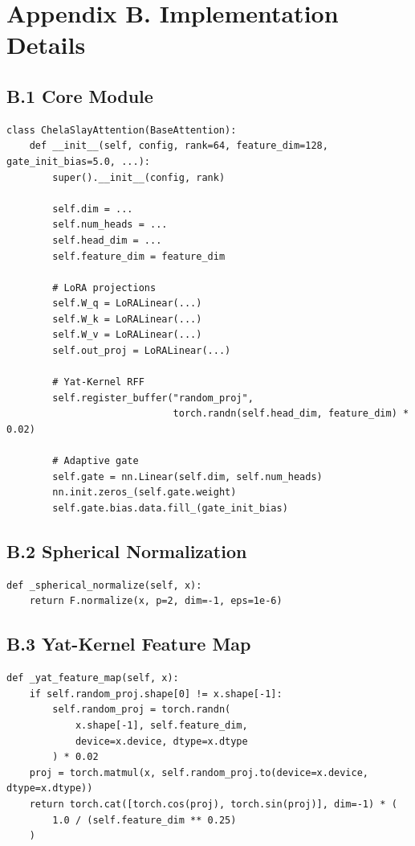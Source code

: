 \section{Appendix B. Implementation Details}

\subsection{B.1 Core Module}

\begin{lstlisting}
class ChelaSlayAttention(BaseAttention):
    def __init__(self, config, rank=64, feature_dim=128, gate_init_bias=5.0, ...):
        super().__init__(config, rank)
        
        self.dim = ...
        self.num_heads = ...
        self.head_dim = ...
        self.feature_dim = feature_dim
        
        # LoRA projections
        self.W_q = LoRALinear(...)
        self.W_k = LoRALinear(...)
        self.W_v = LoRALinear(...)
        self.out_proj = LoRALinear(...)
        
        # Yat-Kernel RFF
        self.register_buffer("random_proj", 
                             torch.randn(self.head_dim, feature_dim) * 0.02)
        
        # Adaptive gate
        self.gate = nn.Linear(self.dim, self.num_heads)
        nn.init.zeros_(self.gate.weight)
        self.gate.bias.data.fill_(gate_init_bias)
\end{lstlisting}

\subsection{B.2 Spherical Normalization}

\begin{lstlisting}
def _spherical_normalize(self, x):
    return F.normalize(x, p=2, dim=-1, eps=1e-6)
\end{lstlisting}

\subsection{B.3 Yat-Kernel Feature Map}

\begin{lstlisting}
def _yat_feature_map(self, x):
    if self.random_proj.shape[0] != x.shape[-1]:
        self.random_proj = torch.randn(
            x.shape[-1], self.feature_dim, 
            device=x.device, dtype=x.dtype
        ) * 0.02
    proj = torch.matmul(x, self.random_proj.to(device=x.device, dtype=x.dtype))
    return torch.cat([torch.cos(proj), torch.sin(proj)], dim=-1) * (
        1.0 / (self.feature_dim ** 0.25)
    )
\end{lstlisting}

